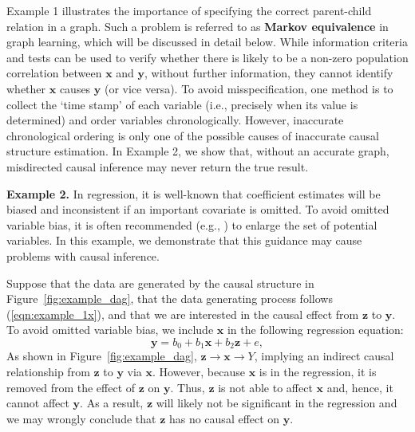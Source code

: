 \documentclass[11pt,review,authoryear]{elsarticle}
\begin{document}
Example 1 illustrates the importance of specifying the correct parent-child relation in a graph. \textcolor[rgb]{0.00,0.00,1.00}{Such a problem is referred to as \textbf{Markov equivalence} in graph learning, which will be discussed in detail below.} While information criteria and tests can be used to verify whether there is likely to be a non-zero population correlation between $\mathbf{x}$ and $\mathbf{y}$, without further information, they cannot identify whether $\mathbf{x}$ causes $\mathbf{y}$ (or vice versa). To avoid misspecification, one method is to collect the `time stamp' of each variable (i.e., precisely when its value is determined) and order variables chronologically. However, inaccurate chronological ordering is only one of the possible causes of inaccurate causal structure estimation. In Example 2, we show that, without an accurate graph, misdirected causal inference may never return the true result.
\medskip

\noindent
\textbf{Example 2.} In regression, it is well-known that coefficient estimates will be biased and inconsistent if an important covariate is omitted. To avoid omitted variable bias, it is often recommended (e.g., \citet{pratt1988interpretation}) to enlarge the set of potential variables. In this example, we demonstrate that this guidance may cause problems with causal inference.

Suppose that the data are generated by the causal structure in Figure~\ref{fig:example_dag}, that the data generating process follows (\ref{eqn:example_1x}), and that we are interested in the causal effect from $\mathbf{z}$ to $\mathbf{y}$. To avoid omitted variable bias, we include $\mathbf{x}$ in the following regression equation:
%
\begin{equation}
  \mathbf{y} = b_0 +  b_1 \mathbf{x} +  b_2 \mathbf{z} + e,
  \label{eqn:example_2}
\end{equation}
%
As shown in Figure~\ref{fig:example_dag}, $\mathbf{z} \rightarrow \mathbf{x} \rightarrow Y$, implying an indirect causal relationship from $\mathbf{z}$ to $\mathbf{y}$ via $\mathbf{x}$. However, because $\mathbf{x}$ is in the regression, it is removed from the effect of $\mathbf{z}$ on $\mathbf{y}$. Thus, $\mathbf{z}$ is not able to affect $\mathbf{x}$ and, hence, it cannot affect $\mathbf{y}$. As a result, $\mathbf{z}$ will likely not be significant in the regression and we may wrongly conclude that $\mathbf{z}$ has no causal effect on $\mathbf{y}$.
\end{document}
